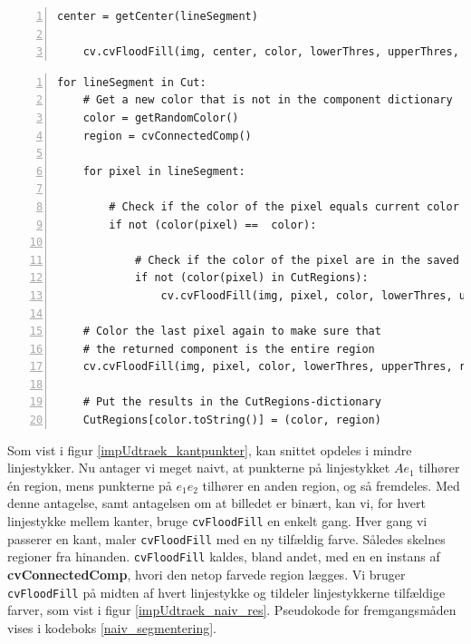 {\begin{lstlisting}[caption={Naiv pseudokode til segmentering af binære
    billeder.},captionpos=b,label={naiv_segmentering},numbers=left,
    frame=single, breaklines=false, float=p]
    center = getCenter(lineSegment)

    cv.cvFloodFill(img, center, color, lowerThres, upperThres, region)

\end{lstlisting}

\begin{lstlisting}[caption={Original pseudokode til udtrækning af
    regioner. Denne kan returnere den samme region flere
    gange.},captionpos=b,label={pseudo_udtraek_org},numbers=left,
    frame=single, breaklines=false, float=h]
for lineSegment in Cut:
    # Get a new color that is not in the component dictionary
    color = getRandomColor()
    region = cvConnectedComp()

    for pixel in lineSegment:

        # Check if the color of the pixel equals current color
        if not (color(pixel) ==  color):

            # Check if the color of the pixel are in the saved regions
            if not (color(pixel) in CutRegions):
                cv.cvFloodFill(img, pixel, color, lowerThres, upperThres, region)

    # Color the last pixel again to make sure that
    # the returned component is the entire region
    cv.cvFloodFill(img, pixel, color, lowerThres, upperThres, region)

    # Put the results in the CutRegions-dictionary
    CutRegions[color.toString()] = (color, region)
\end{lstlisting}

\suppressfloats
\clearpage

Som vist i figur \ref{impUdtraek_kantpunkter}, kan snittet opdeles i
mindre linjestykker. Nu antager vi meget naivt, at punkterne på
linjestykket $Ae_1$ tilhører én region, mens punkterne på $e_1e_2$
tilhører en anden region, og så fremdeles. Med denne antagelse, samt
antagelsen om at billedet er binært, kan vi, for hvert linjestykke
mellem kanter, bruge \texttt{cvFloodFill} en enkelt gang. Hver gang vi
passerer en kant, maler \texttt{cvFloodFill} med en ny tilfældig farve.
Således skelnes regioner fra hinanden. \texttt{cvFloodFill} kaldes,
bland andet, med en en instans af \textbf{cvConnectedComp}, hvori den
netop farvede region lægges. Vi bruger \texttt{cvFloodFill} på midten af
hvert linjestykke og tildeler linjestykkerne tilfældige farver, som vist
i figur \ref{impUdtraek_naiv_res}. Pseudokode for fremgangsmåden vises i
kodeboks \ref{naiv_segmentering}.

}
